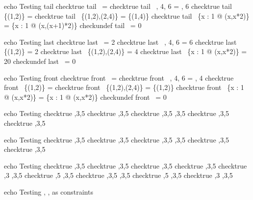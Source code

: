 echo     Testing tail
checktrue tail~  \rangle = \emptyset
checktrue tail~ , 4, 6 \rangle = , 6 \rangle
checktrue tail~ \{(1,2)\} = \emptyset
checktrue tail~ \{(1,2),(2,4)\} = \{(1,4)\}
checktrue tail~ \{x : 1  @ (x,x*2)\} = \{x : 1  @ (x,(x+1)*2)\}
checkundef tail~ \langle \rangle = 0

echo     Testing last
checktrue last~  \rangle = 2
checktrue last~ , 4, 6 \rangle = 6
checktrue last~ \{(1,2)\} = 2
checktrue last~ \{(1,2),(2,4)\} = 4
checktrue last~ \{x : 1  @ (x,x*2)\} = 20
checkundef last~ \langle \rangle = 0

echo     Testing front
checktrue front~  \rangle = \emptyset
checktrue front~ , 4, 6 \rangle = , 4 \rangle
checktrue front~ \{(1,2)\} = \emptyset
checktrue front~ \{(1,2),(2,4)\} = \{(1,2)\}
checktrue front~ \{x : 1  @ (x,x*2)\} = \{x : 1  @ (x,x*2)\}
checkundef front~ \langle \rangle = 0


echo    Testing \prefix
checktrue \langle \rangle  \prefix   {},3,5 \rangle
checktrue  \rangle  \prefix   {},3,5 \rangle
checktrue ,3,5 \rangle  \prefix   {},3,5 \rangle
checktrue \lnot {} \rangle  \prefix   {},3,5 \rangle
checktrue \lnot {} \rangle  \prefix   {},3,5 \rangle

echo    Testing \suffix
checktrue \langle \rangle  \suffix   {},3,5 \rangle
checktrue  \rangle  \suffix   {},3,5 \rangle
checktrue ,3,5 \rangle  \suffix   {},3,5 \rangle
checktrue \lnot {} \rangle  \suffix   {},3,5 \rangle
checktrue \lnot {} \rangle  \suffix   {},3,5 \rangle

echo    Testing \inseq
checktrue \langle \rangle  \inseq   {},3,5 \rangle
checktrue  \rangle  \inseq   {},3,5 \rangle
checktrue  \rangle  \inseq   {},3,5 \rangle
checktrue  \rangle  \inseq   {},3,5 \rangle
checktrue ,3 \rangle  \inseq   {},3,5 \rangle
checktrue ,5 \rangle  \inseq   {},3,5 \rangle
checktrue ,3,5 \rangle  \inseq   {},3,5 \rangle
checktrue \lnot {},5 \rangle  \inseq   {},3,5 \rangle
checktrue \lnot {},3 \rangle  \inseq   {},3,5 \rangle

echo    Testing \prefix, \suffix, \inseq as constraints


